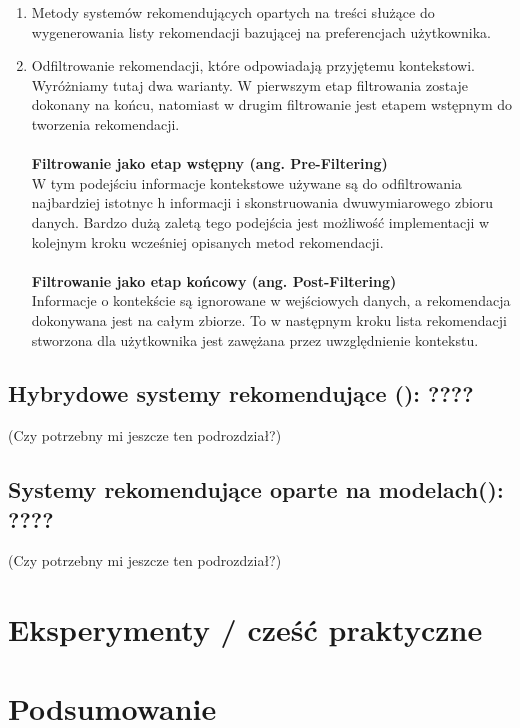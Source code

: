 \documentclass[12pt,a4paper]{report}
\begin{document}
\begin{enumerate}
\item Metody systemów rekomendujących opartych na treści służące do wygenerowania listy rekomendacji bazującej na  preferencjach użytkownika.
\item Odfiltrowanie rekomendacji, które odpowiadają przyjętemu kontekstowi.
\\Wyróżniamy tutaj dwa warianty. W pierwszym etap filtrowania zostaje dokonany na końcu, natomiast w drugim filtrowanie jest etapem wstępnym do tworzenia rekomendacji.
\\
\\
\textbf{Filtrowanie jako etap wstępny (ang. Pre-Filtering)}
\\W tym podejściu informacje kontekstowe używane są do odfiltrowania najbardziej istotnyc    h informacji i skonstruowania dwuwymiarowego zbioru danych. Bardzo dużą zaletą tego podejścia jest możliwość implementacji w kolejnym kroku wcześniej opisanych metod rekomendacji. 
\\
\\ \textbf{Filtrowanie jako etap końcowy (ang. Post-Filtering)}
\\Informacje o kontekście są ignorowane w wejściowych danych, a rekomendacja dokonywana jest na całym zbiorze. To w następnym kroku lista rekomendacji stworzona dla użytkownika jest zawężana przez uwzględnienie kontekstu.
\end{enumerate}

\section{Hybrydowe systemy rekomendujące (): ????}
(Czy potrzebny mi jeszcze ten podrozdział?)

\section{Systemy rekomendujące oparte na modelach(): ????}
(Czy potrzebny mi jeszcze ten podrozdział?)



\chapter{Eksperymenty / cześć praktyczne}

\chapter{Podsumowanie}



\nocite{*} %


\end{document}
